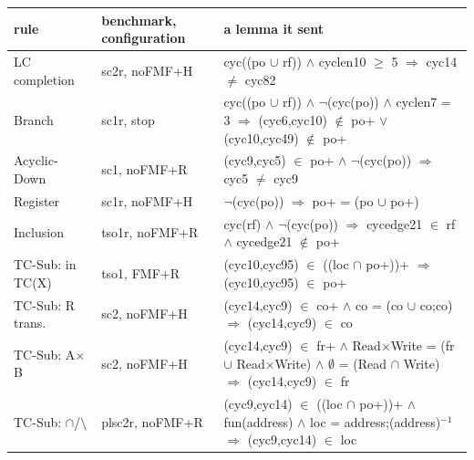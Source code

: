 \begin{tabular}{@{}p{2.2cm}p{2.0cm}p{9.6cm}@{}}
\toprule
rule & benchmark, configuration & a lemma it sent \\
\midrule
LC completion & sc2r, noFMF+H & {\ttfamily\raggedright cyc((po $\cup$ rf)) $\wedge$ cyclen10 $\ge$ 5 $\Rightarrow$ cyc14 $\ne$ cyc82} \\
Branch & sc1r, stop & {\ttfamily\raggedright cyc((po $\cup$ rf)) $\wedge$ $\neg$(cyc(po)) $\wedge$ cyclen7 = 3 $\Rightarrow$ (cyc6,cyc10) $\notin$ po+ $\vee$ (cyc10,cyc49) $\notin$ po+} \\
Acyclic-Down & sc1, noFMF+R & {\ttfamily\raggedright (cyc9,cyc5) $\in$ po+ $\wedge$ $\neg$(cyc(po)) $\Rightarrow$ cyc5 $\ne$ cyc9} \\
Register & sc1r, noFMF+H & {\ttfamily\raggedright $\neg$(cyc(po)) $\Rightarrow$ po+ = (po $\cup$ po+)} \\
Inclusion & tso1r, noFMF+R & {\ttfamily\raggedright cyc(rf) $\wedge$ $\neg$(cyc(po)) $\Rightarrow$ cycedge21 $\in$ rf $\wedge$ cycedge21 $\notin$ po+} \\
TC-Sub: in TC(X) & tso1, FMF+R & {\ttfamily\raggedright (cyc10,cyc95) $\in$ ((loc $\cap$ po+))+ $\Rightarrow$ (cyc10,cyc95) $\in$ po+} \\
TC-Sub: R trans. & sc2, noFMF+H & {\ttfamily\raggedright (cyc14,cyc9) $\in$ co+ $\wedge$ co = (co $\cup$ co;co) $\Rightarrow$ (cyc14,cyc9) $\in$ co} \\
TC-Sub: A$\times$B & sc2, noFMF+H & {\ttfamily\raggedright (cyc14,cyc9) $\in$ fr+ $\wedge$ Read$\times$Write = (fr $\cup$ Read$\times$Write) $\wedge$ $\emptyset$ = (Read $\cap$ Write) $\Rightarrow$ (cyc14,cyc9) $\in$ fr} \\
TC-Sub: $\cap$/$\setminus$ & plsc2r, noFMF+R & {\ttfamily\raggedright (cyc9,cyc14) $\in$ ((loc $\cap$ po+))+ $\wedge$ fun(address) $\wedge$ loc = address;(address)$^{-1}$ $\Rightarrow$ (cyc9,cyc14) $\in$ loc} \\
\bottomrule
\end{tabular}
